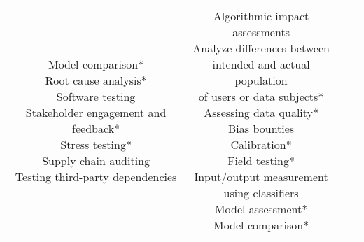\documentclass[fleqn]{article}
\begin{document}
\begin{landscape}
\begin{table}[H]
\begin{tabular}{|c|c|c|c|}
{			\textbullet\hspace{3pt} Model comparison*\\ 
			\textbullet\hspace{3pt} Root cause analysis*\\ 
			\textbullet\hspace{3pt} Software testing \\ 
			\textbullet\hspace{3pt} Stakeholder engagement and feedback*\\ 
			\textbullet\hspace{3pt} Stress testing*\\ 
			\textbullet\hspace{3pt} Supply chain auditing \\ 
			\textbullet\hspace{3pt} Testing third-party dependencies \\
		}
		& \makecell[l]{
			\textbullet\hspace{3pt} Algorithmic impact\\\hspace{10pt}assessments\\  	
			\textbullet\hspace{3pt} Analyze differences between\\\hspace{10pt}intended and actual population\\\hspace{10pt}of users or data subjects*\\ 			
			\textbullet\hspace{3pt} Assessing data quality*\\  		
			\textbullet\hspace{3pt} Bias bounties\\  	
			\textbullet\hspace{3pt} Calibration*\\  	
			\textbullet\hspace{3pt} Field testing*\\  	
			\textbullet\hspace{3pt} Input/output measurement\\\hspace{10pt}using classifiers \\ 
			\textbullet\hspace{3pt} Model assessment*\\  	
			\textbullet\hspace{3pt} Model comparison*\\  	
}
\end{tabular}
\end{table}
\end{landscape}
\end{document}
